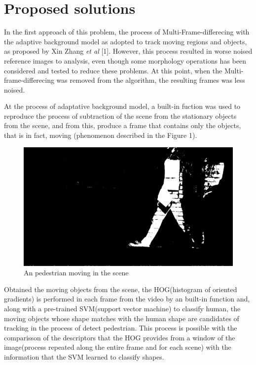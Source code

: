 \documentclass[conference]{IEEEtran}
\begin{document}
\section{Proposed solutions}

	In the first approach of this problem, the process of Multi-Frame-differecing with the adaptive background model as adopted to track moving regions and objects, as proposed by Xin Zhang \textit{et al} [1]. However, this process resulted in worse noised reference images to analysis, even though some morphology operations has been considered and tested to reduce these problems. At this point, when the Multi-frame-differecing was removed from the algorithm, the resulting frames was less noised.
	
	At the process of adaptative background model, a built-in fuction was used to reproduce the process of subtraction of the scene from the stationary objects from the scene, and from this, produce a frame that contains only the objects, that is in fact, moving (phenomenon described in the Figure 1).
	
	\begin{figure}[htbp]
	\centerline{\includegraphics[scale=0.5]{background_sub.png}}
	\caption{An pedestrian moving in the scene}
	\label{fig}
	\end{figure}
	
	Obtained the moving objects from the scene, the HOG(histogram of oriented gradients) is performed in each frame from the video by an built-in function and, along with a pre-trained SVM(support vector machine) to classify human, the moving objects whose shape matches with the human shape are candidates of tracking in the process of detect pedestrian. This process is possible with the comparisson of the descriptors that the HOG provides from a window of the image(process repeated along the entire frame and for each scene) with the information that the SVM learned to classify shapes.	
	
\end{document}
